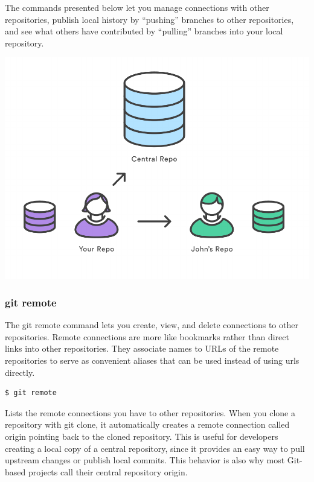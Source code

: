 \documentclass{article}
\begin{document}
The commands presented below let you manage connections with other
repositories, publish local history by ``pushing'' branches to other
repositories, and see what others have contributed by ``pulling''
branches into your local repository.

\begin{center}
\includegraphics[scale=0.5]{figures/06.pdf}
\end{center}

\subsubsection*{git remote}

The git remote command lets you create, view, and delete connections
to other repositories. Remote connections are more like bookmarks
rather than direct links into other repositories. They associate names
to URLs of the remote repositories to serve as convenient aliases
that can be used instead of using urls directly.

\begin{lstlisting}
$ git remote
\end{lstlisting}

Lists the remote connections you have to other repositories.
When you clone a repository with git clone, it automatically creates a
remote connection called origin pointing back to the cloned
repository. This is useful for developers creating a local copy of a
central repository, since it provides an easy way to pull upstream
changes or publish local commits. This behavior is also why most
Git-based projects call their central repository origin.
\end{document}
